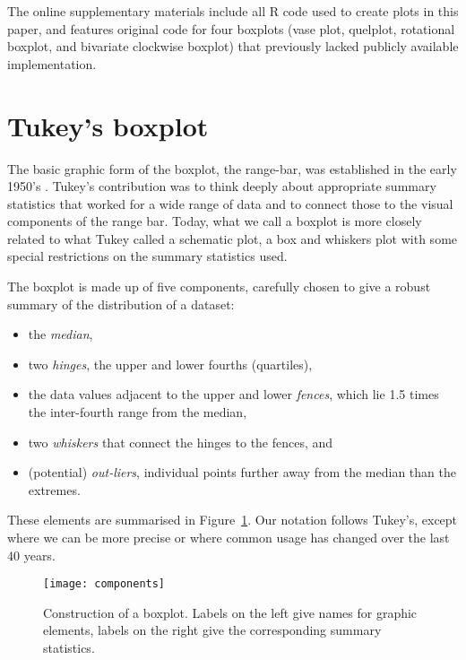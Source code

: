 \documentclass[oneside]{article}
\begin{document}
The online supplementary materials include all R code \citep{R} used to create plots in this paper, and features original code for four boxplots (vase plot, quelplot, rotational boxplot, and bivariate clockwise boxplot) that previously lacked publicly available implementation.

\section{Tukey's boxplot}
\label{sec:tukey}

The basic graphic form of the boxplot, the range-bar, was established in the early 1950's \citet[pg. 164]{spear:1952}. Tukey's contribution was to think deeply about appropriate summary statistics that worked for a wide range of data and to connect those to the visual components of the range bar. Today, what we call a boxplot is more closely related to what Tukey called a schematic plot, a box and whiskers plot with some special restrictions on the summary statistics used. %

The boxplot is made up of five components, carefully chosen to give a robust summary of the distribution of a dataset:

\begin{itemize}

\item the \emph{median},

\item two \emph{hinges}, the upper and lower fourths (quartiles),

\item the data values adjacent to the upper and lower \emph{fences}, which lie 1.5 times the inter-fourth range from the median,

\item two \emph{whiskers} that connect the hinges to the fences, and

\item (potential) \emph{out-liers}, individual points further away from the median than the extremes.

\end{itemize}

\noindent These elements are summarised in Figure~\ref{fig:construction}. Our notation follows Tukey's, except where we can be more precise or where common usage has changed over the last 40 years.

\begin{figure}[htbp]
  \centering
  \texttt{[image: components]}
  \caption{Construction of a boxplot.  Labels on the left give names for graphic elements, labels on the right give the corresponding summary statistics.}
  \label{fig:construction}
\end{figure}
\end{document}

